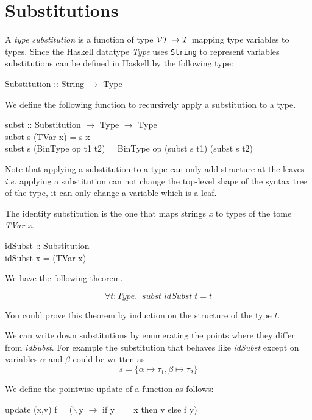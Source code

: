 \documentclass[11pt]{article}
\begin{document}
\section{Substitutions}

A {\em{type substitution }} is a function of type ${\cal{VT}}\rightarrow{}T$
mapping type variables to types.  Since the Haskell datatype {\it{Type}} uses
{\tt{String}} to represent variables substitutions can be defined in Haskell by
the following type:
\begin{smallprogram*}
\> Substitution :: String $\rightarrow$ Type \\
\end{smallprogram*}
We define the following function to recursively apply a substitution to a type.
\begin{smallprogram*}
\> subst :: Substitution $\rightarrow$ Type $\rightarrow$ Type\\
\> subst s (TVar x) = s x \\
\> subst s (BinType op t1 t2) = BinType op (subst s t1) (subst s t2) \\
\end{smallprogram*}
Note that applying a substitution to a type can only add structure at the
leaves {\em{i.e.}} applying a substitution can not change the top-level shape of
the syntax tree of the type, it can only change a variable which is a leaf.

The identity substitution is the one that maps strings {\it{x}} to types of the tome {\it{TVar x}}.
\begin{smallprogram*}
\> idSubst :: Substitution\\
\> idSubst x = (TVar x)\\
\end{smallprogram*}
We have the following theorem.
\begin{theorem}
\[\forall{}t:{\mathit{Type}}.\;\; {\mathit{subst}} \; {\mathit{idSubst}} \; t = t\]
\end{theorem}
You could prove this theorem by induction on the structure of the type $t$.

We can write down substitutions by enumerating the points where they differ
from {\it{idSubst}}.  For example the substitution that behaves like
{\it{idSubst}} except on variables $\alpha$ and $\beta$  could be written as
\[s = \{\alpha\mapsto{}\tau_1,\beta\mapsto\tau_2\}\]

We define the pointwise update of a function as follows:
\begin{smallprogram*}
\> update (x,v) f = ($\backslash\,$y $\rightarrow$  if y == x then v else f y)\\
\end{smallprogram*} 
\end{document}
